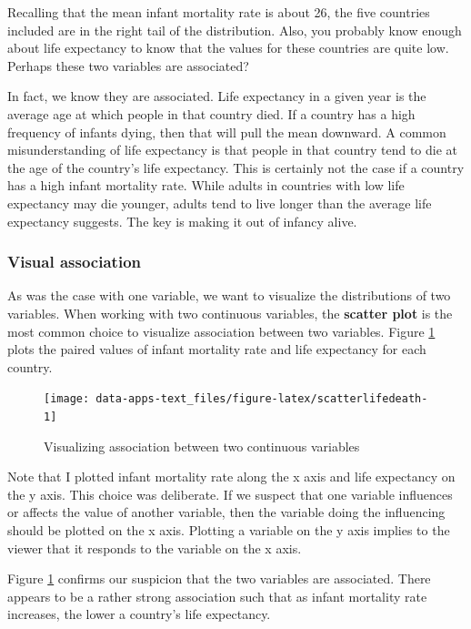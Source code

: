\documentclass[
]{book}
\begin{document}
Recalling that the mean infant mortality rate is about 26, the five countries included are in the right tail of the distribution. Also, you probably know enough about life expectancy to know that the values for these countries are quite low. Perhaps these two variables are associated?

In fact, we know they are associated. Life expectancy in a given year is the average age at which people in that country died. If a country has a high frequency of infants dying, then that will pull the mean downward. A common misunderstanding of life expectancy is that people in that country tend to die at the age of the country's life expectancy. This is certainly not the case if a country has a high infant mortality rate. While adults in countries with low life expectancy may die younger, adults tend to live longer than the average life expectancy suggests. The key is making it out of infancy alive.

\hypertarget{visual-association}{%
\subsubsection*{Visual association}\label{visual-association}}


As was the case with one variable, we want to visualize the distributions of two variables. When working with two continuous variables, the \textbf{scatter plot} is the most common choice to visualize association between two variables. Figure \ref{fig:scatterlifedeath} plots the paired values of infant mortality rate and life expectancy for each country.

\begin{figure}

{\centering \texttt{[image: data-apps-text\_files/figure-latex/scatterlifedeath-1]} 

}

\caption{Visualizing association between two continuous variables}\label{fig:scatterlifedeath}
\end{figure}

Note that I plotted infant mortality rate along the x axis and life expectancy on the y axis. This choice was deliberate. If we suspect that one variable influences or affects the value of another variable, then the variable doing the influencing should be plotted on the x axis. Plotting a variable on the y axis implies to the viewer that it responds to the variable on the x axis.

Figure \ref{fig:scatterlifedeath} confirms our suspicion that the two variables are associated. There appears to be a rather strong association such that as infant mortality rate increases, the lower a country's life expectancy.
\end{document}
